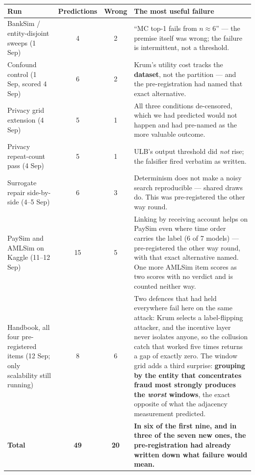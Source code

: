 \documentclass[11pt]{article}
\begin{document}
\begin{center}\small
\begin{tabularx}{\linewidth}{@{}p{5.4cm} c c X@{}}
\toprule
\textbf{Run} & \textbf{Predictions} & \textbf{Wrong} & \textbf{The most useful failure} \\
\midrule
BankSim / entity-disjoint sweeps (1 Sep) & 4 & 2 & ``MC top-1 fails from $n\!\approx\!6$'' --- the premise itself was wrong; the failure is intermittent, not a threshold. \\
Confound control (1 Sep, scored 4 Sep) & 6 & 2 & Krum's utility cost tracks the \textbf{dataset}, not the partition --- and the pre-registration had named that exact alternative. \\
Privacy grid extension (4 Sep) & 5 & 1 & All three conditions de-censored, which we had predicted would not happen and had pre-named as the more valuable outcome. \\
Privacy repeat-count pass (4 Sep) & 5 & 1 & ULB's output threshold did \emph{not} rise; the falsifier fired verbatim as written. \\
Surrogate repair side-by-side (4--5 Sep) & 6 & 3 & Determinism does not make a noisy search reproducible --- shared draws do. This was pre-registered the other way round. \\
PaySim and AMLSim on Kaggle (11--12 Sep) & 15 & 5 & Linking by receiving account helps on PaySim even where time order carries the label (6 of 7 models) --- pre-registered the other way round, with that exact alternative named. One more AMLSim item scores as two scores with no verdict and is counted neither way. \\
Handbook, all four pre-registered items (12 Sep; only scalability still running) & 8 & 6 & Two defences that had held everywhere fail here on the same attack: Krum selects a label-flipping attacker, and the incentive layer never isolates anyone, so the collusion catch that worked five times returns a gap of exactly zero. The window grid adds a third surprise: \textbf{grouping by the entity that concentrates fraud most strongly produces the \emph{worst} windows}, the exact opposite of what the adjacency measurement predicted. \\
\midrule
\textbf{Total} & \textbf{49} & \textbf{20} & \textbf{In six of the first nine, and in three of the seven new ones, the pre-registration had already written down what failure would mean.} \\
\bottomrule
\end{tabularx}
\end{center}
\end{document}
